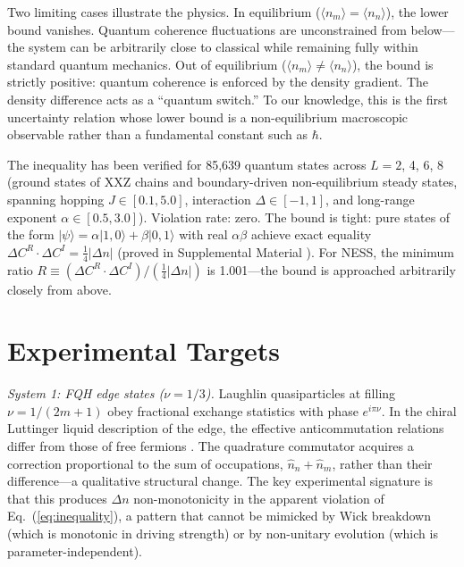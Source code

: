 \documentclass[aps,prd,reprint,superscriptaddress,twocolumn]{revtex4-2}
\begin{document}
Two limiting cases illustrate the physics. In equilibrium ($\langle n_m\rangle = \langle n_n\rangle$), the lower bound vanishes. Quantum coherence fluctuations are unconstrained from below---the system can be arbitrarily close to classical while remaining fully within standard quantum mechanics. Out of equilibrium ($\langle n_m\rangle \neq \langle n_n\rangle$), the bound is strictly positive: quantum coherence is enforced by the density gradient. The density difference acts as a ``quantum switch.'' To our knowledge, this is the first uncertainty relation whose lower bound is a non-equilibrium macroscopic observable rather than a fundamental constant such as $\hbar$.

The inequality has been verified for 85,639 quantum states across $L = 2$, 4, 6, 8 (ground states of XXZ chains and boundary-driven non-equilibrium steady states, spanning hopping $J\in[0.1,5.0]$, interaction $\Delta\in[-1,1]$, and long-range exponent $\alpha\in[0.5,3.0]$). Violation rate: zero. The bound is tight: pure states of the form $|\psi\rangle = \alpha|1,0\rangle + \beta|0,1\rangle$ with real $\alpha\beta$ achieve exact equality $\Delta C^R \cdot \Delta C^I = \frac{1}{4}|\Delta n|$ (proved in Supplemental Material \cite{SM}). For NESS, the minimum ratio $R \equiv (\Delta C^R \cdot \Delta C^I)/(\frac{1}{4}|\Delta n|)$ is 1.001---the bound is approached arbitrarily closely from above.

\section{Experimental Targets}

\textit{System 1: FQH edge states ($\nu = 1/3$).} Laughlin quasiparticles at filling $\nu = 1/(2m+1)$ obey fractional exchange statistics with phase $e^{i\pi\nu}$. In the chiral Luttinger liquid description of the edge, the effective anticommutation relations differ from those of free fermions \cite{Wen2004}. The quadrature commutator acquires a correction proportional to the sum of occupations, $\hat{n}_n + \hat{n}_m$, rather than their difference---a qualitative structural change. The key experimental signature is that this produces $\Delta n$ non-monotonicity in the apparent violation of Eq.~(\ref{eq:inequality}), a pattern that cannot be mimicked by Wick breakdown (which is monotonic in driving strength) or by non-unitary evolution (which is parameter-independent).
\end{document}
